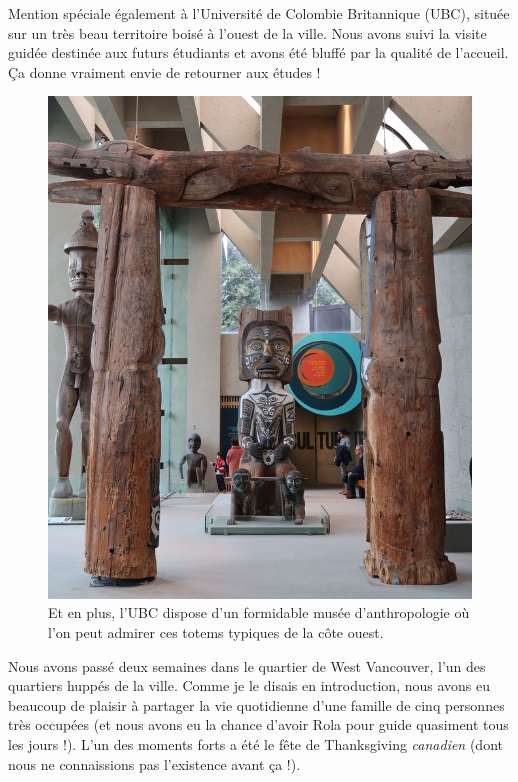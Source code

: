 Mention spéciale également à l'Université de Colombie Britannique (UBC),
située sur un très beau territoire boisé à l'ouest de la ville. Nous
avons suivi la visite guidée destinée aux futurs étudiants et avons été
bluffé par la qualité de l'accueil. Ça donne vraiment envie de retourner
aux études !

\begin{figure}
\centering
\includegraphics{images/20181016_ubc.JPG}
\caption{Et en plus, l'UBC dispose d'un formidable musée d'anthropologie
où l'on peut admirer ces totems typiques de la côte ouest.}
\end{figure}

Nous avons passé deux semaines dans le quartier de West Vancouver, l'un
des quartiers huppés de la ville. Comme je le disais en introduction,
nous avons eu beaucoup de plaisir à partager la vie quotidienne d'une
famille de cinq personnes très occupées (et nous avons eu la chance
d'avoir Rola pour guide quasiment tous les jours !). L'un des moments
forts a été le fête de Thanksgiving \emph{canadien} (dont nous ne
connaissions pas l'existence avant ça !).

